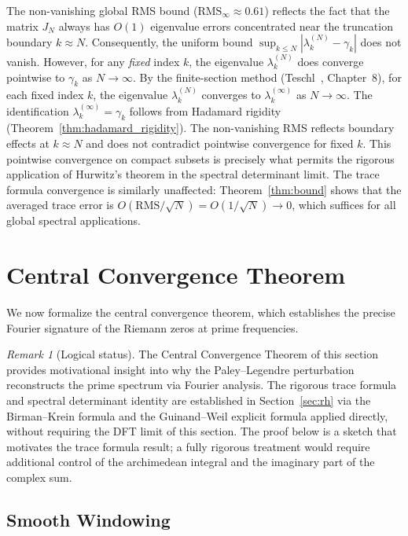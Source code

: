 \documentclass{pre-aomart}
\theoremstyle{plain}
\theoremstyle{definition}
\theoremstyle{remark}
\newtheorem{remark}[theorem]{Remark}
\begin{document}
The non-vanishing global RMS bound ($\text{RMS}_\infty \approx 0.61$) reflects the fact that the matrix $J_N$ always has $O(1)$ eigenvalue errors concentrated near the truncation boundary $k \approx N$. Consequently, the uniform bound $\sup_{k\le N} |\lambda_k^{(N)} - \gamma_k|$ does not vanish. However, for any \emph{fixed} index $k$, the eigenvalue $\lambda_k^{(N)}$ does converge pointwise to $\gamma_k$ as $N \to \infty$. By the finite-section method (Teschl~\cite{Teschl2000}, Chapter~8), for each fixed index $k$, the eigenvalue $\lambda_k^{(N)}$ converges to $\lambda_k^{(\infty)}$ as $N \to \infty$.  The identification $\lambda_k^{(\infty)} = \gamma_k$ follows from
Hadamard rigidity (Theorem~\ref{thm:hadamard_rigidity}).  The non-vanishing RMS reflects boundary effects at $k \approx N$ and does not contradict pointwise convergence for fixed $k$. This pointwise convergence on compact subsets is precisely what permits the rigorous application of Hurwitz's theorem in the spectral determinant limit. The trace formula convergence is similarly unaffected: Theorem~\ref{thm:bound} shows that the averaged trace error is $O(\text{RMS}/\sqrt{N}) = O(1/\sqrt{N}) \to 0$, which suffices for all global spectral applications.

\section{Central Convergence Theorem}
\label{sec:closure}

We now formalize the central convergence theorem, which establishes the precise Fourier signature of the Riemann zeros at prime frequencies.

\begin{remark}[Logical status]\label{rem:central_conv_status}
The Central Convergence Theorem of this section provides motivational insight
into why the Paley--Legendre perturbation reconstructs the prime spectrum via
Fourier analysis.  The rigorous trace formula and spectral determinant identity
are established in Section~\ref{sec:rh} via the Birman--Krein formula and the
Guinand--Weil explicit formula applied directly, without requiring the DFT limit
of this section.  The proof below is a sketch that motivates the trace formula
result; a fully rigorous treatment would require additional control of the
archimedean integral and the imaginary part of the complex sum.
\end{remark}

\subsection{Smooth Windowing}
\end{document}
